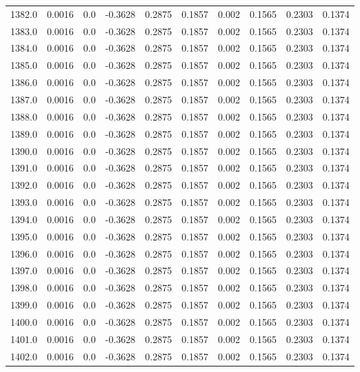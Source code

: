 \begin{longtable}{lrrrrrrrrr}
1382.0 & 0.0016 & 0.0 & -0.3628 & 0.2875 & 0.1857 & 0.002 & 0.1565 & 0.2303 & 0.1374 \\
1383.0 & 0.0016 & 0.0 & -0.3628 & 0.2875 & 0.1857 & 0.002 & 0.1565 & 0.2303 & 0.1374 \\
1384.0 & 0.0016 & 0.0 & -0.3628 & 0.2875 & 0.1857 & 0.002 & 0.1565 & 0.2303 & 0.1374 \\
1385.0 & 0.0016 & 0.0 & -0.3628 & 0.2875 & 0.1857 & 0.002 & 0.1565 & 0.2303 & 0.1374 \\
1386.0 & 0.0016 & 0.0 & -0.3628 & 0.2875 & 0.1857 & 0.002 & 0.1565 & 0.2303 & 0.1374 \\
1387.0 & 0.0016 & 0.0 & -0.3628 & 0.2875 & 0.1857 & 0.002 & 0.1565 & 0.2303 & 0.1374 \\
1388.0 & 0.0016 & 0.0 & -0.3628 & 0.2875 & 0.1857 & 0.002 & 0.1565 & 0.2303 & 0.1374 \\
1389.0 & 0.0016 & 0.0 & -0.3628 & 0.2875 & 0.1857 & 0.002 & 0.1565 & 0.2303 & 0.1374 \\
1390.0 & 0.0016 & 0.0 & -0.3628 & 0.2875 & 0.1857 & 0.002 & 0.1565 & 0.2303 & 0.1374 \\
1391.0 & 0.0016 & 0.0 & -0.3628 & 0.2875 & 0.1857 & 0.002 & 0.1565 & 0.2303 & 0.1374 \\
1392.0 & 0.0016 & 0.0 & -0.3628 & 0.2875 & 0.1857 & 0.002 & 0.1565 & 0.2303 & 0.1374 \\
1393.0 & 0.0016 & 0.0 & -0.3628 & 0.2875 & 0.1857 & 0.002 & 0.1565 & 0.2303 & 0.1374 \\
1394.0 & 0.0016 & 0.0 & -0.3628 & 0.2875 & 0.1857 & 0.002 & 0.1565 & 0.2303 & 0.1374 \\
1395.0 & 0.0016 & 0.0 & -0.3628 & 0.2875 & 0.1857 & 0.002 & 0.1565 & 0.2303 & 0.1374 \\
1396.0 & 0.0016 & 0.0 & -0.3628 & 0.2875 & 0.1857 & 0.002 & 0.1565 & 0.2303 & 0.1374 \\
1397.0 & 0.0016 & 0.0 & -0.3628 & 0.2875 & 0.1857 & 0.002 & 0.1565 & 0.2303 & 0.1374 \\
1398.0 & 0.0016 & 0.0 & -0.3628 & 0.2875 & 0.1857 & 0.002 & 0.1565 & 0.2303 & 0.1374 \\
1399.0 & 0.0016 & 0.0 & -0.3628 & 0.2875 & 0.1857 & 0.002 & 0.1565 & 0.2303 & 0.1374 \\
1400.0 & 0.0016 & 0.0 & -0.3628 & 0.2875 & 0.1857 & 0.002 & 0.1565 & 0.2303 & 0.1374 \\
1401.0 & 0.0016 & 0.0 & -0.3628 & 0.2875 & 0.1857 & 0.002 & 0.1565 & 0.2303 & 0.1374 \\
1402.0 & 0.0016 & 0.0 & -0.3628 & 0.2875 & 0.1857 & 0.002 & 0.1565 & 0.2303 & 0.1374 \\

\end{longtable}
